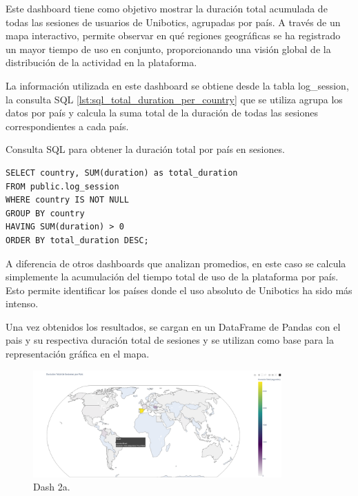 \documentclass[a4paper, 12pt]{book}
\begin{document}
Este dashboard tiene como objetivo mostrar la duración total acumulada de todas las sesiones de usuarios de Unibotics, agrupadas por país. A través de un mapa interactivo, permite observar en qué regiones geográficas se ha registrado un mayor tiempo de uso en conjunto, proporcionando una visión global de la distribución de la actividad en la plataforma.

La información utilizada en este dashboard se obtiene desde la tabla log\_session, la consulta SQL \ref{lst:sql_total_duration_per_country} que se utiliza agrupa los datos por país y calcula la suma total de la duración de todas las sesiones correspondientes a cada país.

\begin{listing}[h!]
    \caption{Consulta SQL para obtener la duración total por país en sesiones.}{}
    \label{lst:sql_total_duration_per_country}
    \begin{verbatim}
SELECT country, SUM(duration) as total_duration
FROM public.log_session
WHERE country IS NOT NULL
GROUP BY country
HAVING SUM(duration) > 0
ORDER BY total_duration DESC;
    \end{verbatim}
\end{listing}

A diferencia de otros dashboards que analizan promedios, en este caso se calcula simplemente la acumulación del tiempo total de uso de la plataforma por país. Esto permite identificar los países donde el uso absoluto de Unibotics ha sido más intenso.

Una vez obtenidos los resultados, se cargan en un DataFrame de Pandas con el pais y su respectiva duración total de sesiones y se utilizan como base para la representación gráfica en el mapa.

\begin{figure}
  \centering
  \includegraphics[width=0.85\textwidth, keepaspectratio]{img/2a.png}
  \caption{Dash 2a.}\label{fig:2a}
\end{figure}
\end{document}
